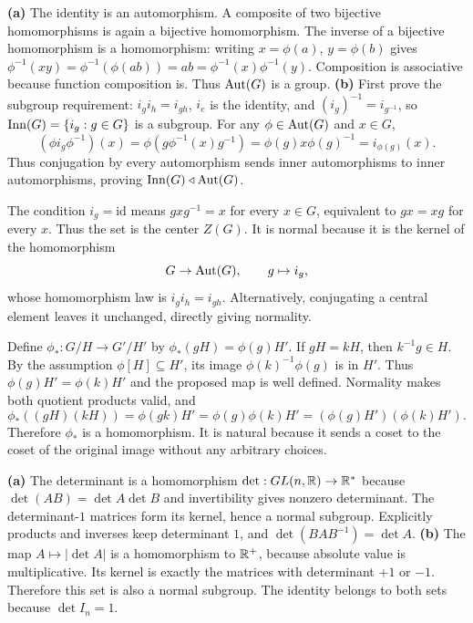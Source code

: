 \textbf{(a)} The identity is an automorphism. A composite of two bijective homomorphisms is again a bijective homomorphism. The inverse of a bijective homomorphism is a homomorphism: writing $x=\phi(a)$, $y=\phi(b)$ gives $\phi^{-1}(xy)=\phi^{-1}(\phi(ab))=ab=\phi^{-1}(x)\phi^{-1}(y)$. Composition is associative because function composition is. Thus $\operatorname{Aut}(G)$ is a group.
\textbf{(b)} First prove the subgroup requirement: $i_gi_h=i_{gh}$, $i_e$ is the identity, and $(i_g)^{-1}=i_{g^{-1}}$, so $\operatorname{Inn}(G)=\{i_g:g\in G\}$ is a subgroup. For any $\phi\in\operatorname{Aut}(G)$ and $x\in G$,
\[(\phi i_g\phi^{-1})(x)=\phi(g\phi^{-1}(x)g^{-1})=\phi(g)x\phi(g)^{-1}=i_{\phi(g)}(x).\]
Thus conjugation by every automorphism sends inner automorphisms to inner automorphisms, proving $\operatorname{Inn}(G)\triangleleft\operatorname{Aut}(G)$.

The condition $i_g=\mathrm{id}$ means $gxg^{-1}=x$ for every $x\in G$, equivalent to $gx=xg$ for every $x$. Thus the set is the center $Z(G)$. It is normal because it is the kernel of the homomorphism
\[G\to\operatorname{Aut}(G),\qquad g\mapsto i_g,\]
whose homomorphism law is $i_gi_h=i_{gh}$. Alternatively, conjugating a central element leaves it unchanged, directly giving normality.

Define $\phi_*:G/H\to G'/H'$ by $\phi_*(gH)=\phi(g)H'$.
 If $gH=kH$, then $k^{-1}g\in H$. By the assumption $\phi[H]\subseteq H'$, its image $\phi(k)^{-1}\phi(g)$ is in $H'$. Thus $\phi(g)H'=\phi(k)H'$ and the proposed map is well defined.
 Normality makes both quotient products valid, and
\[\phi_*((gH)(kH))=\phi(gk)H'=\phi(g)\phi(k)H'
=(\phi(g)H')(\phi(k)H').\]
Therefore $\phi_*$ is a homomorphism. It is natural because it sends a coset to the coset of the original image without any arbitrary choices.

\textbf{(a)} The determinant is a homomorphism $\det:GL(n,\mathbb{R})\to\mathbb{R}^*$ because $\det(AB)=\det A\det B$ and invertibility gives nonzero determinant. The determinant-$1$ matrices form its kernel, hence a normal subgroup. Explicitly products and inverses keep determinant $1$, and $\det(BAB^{-1})=\det A$.
\textbf{(b)} The map $A\mapsto|\det A|$ is a homomorphism to $\mathbb{R}^+$, because absolute value is multiplicative. Its kernel is exactly the matrices with determinant $+1$ or $-1$. Therefore this set is also a normal subgroup. The identity belongs to both sets because $\det I_n=1$.

